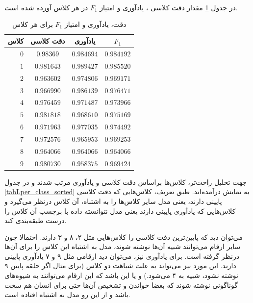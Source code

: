 در جدول 
\ref{tab:per_class_f1}
مقدار 
دقت کلاسی
، 
یادآوری
و امتیاز 
$F_1$
در هر کلاس آورده شده است.
\begin{table}[H]
	\centering
	\caption{دقت، یادآوری و امتیاز $F_1$ برای هر کلاس}
	\label{tab:per_class_f1}

	\begin{tabular}{r|c|c|c}
		\textbf{کلاس} & \textbf{دقت کلاسی} & \textbf{یادآوری} & \textbf{$F_1$} \\
		\hline
		\textbf{$0$} & $0.98369$  & $0.984694$ & \textbf{$0.984192$} \\
		\textbf{$1$} & $0.981643$ & $0.989427$ & \textbf{$0.985520$} \\
		\textbf{$2$} & $0.963602$ & $0.974806$ & \textbf{$0.969171$} \\
		\textbf{$3$} & $0.966990$ & $0.986139$ & \textbf{$0.976471$} \\
		\textbf{$4$} & $0.976459$ & $0.971487$ & \textbf{$0.973966$} \\
		\textbf{$5$} & $0.981818$ & $0.968610$ & \textbf{$0.975169$} \\
		\textbf{$6$} & $0.971963$ & $0.977035$ & \textbf{$0.974492$} \\
		\textbf{$7$} & $0.972576$ & $0.965953$ & \textbf{$0.969253$} \\
		\textbf{$8$} & $0.964066$ & $0.964066$ & \textbf{$0.964066$} \\
		\textbf{$9$} & $0.980730$ & $0.958375$ & \textbf{$0.969424$} \\
	\end{tabular}

\end{table}

جهت تحلیل راحت‌تر، کلاس‌ها براساس دقت کلاسی و یادآوری مرتب شدند و در جدول 
\ref{tabLper_class_sorted}
به نمایش درآمده‌اند. طبق تعریف، کلاس‌هایی که دقت کلاسی پایینی دارند، یعنی مدل سایر کلاس‌ها را به اشتباه، آن کلاس درنظر می‌گیرد و کلاس‌هایی که یادآوری پایینی دارند یعنی مدل نتوانسته داده با برچسب آن کلاس را درست طبقه‌بندی کند. 

می‌توان دید که پایین‌ترین دقت‌ کلاسی را کلاس‌هایی مثل ۲، ۸ و ۳ دارند. احتمالا چون سایر ارقام می‌توانند شبیه آن‌ها نوشته شوند، مدل به اشتباه این کلاس را برای آن‌ها درنظر گرفته است. برای یادآوری نیز، می‌توان دید ارقامی مثل ۹ و ۷ یادآوری پایینی دارند. این مورد نیز می‌تواند به علت شباهت دو کلاس (برای مثال اگر حلقه پایین ۹ نوشته نشود، شبیه به ۴ می‌شود.) و یا این باشد که این ارقام می‌توانند به شیوه‌های گوناگونی نوشته شوند که بعضا خواندن و تشخیص آن‌ها حتی برای انسان هم سخت باشد و از این رو مدل به اشتباه افتاده است. 

